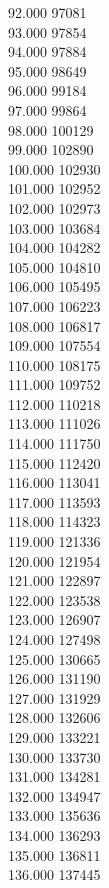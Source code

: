 { 92.000	97081 \\
 93.000	97854 \\
 94.000	97884 \\
 95.000	98649 \\
 96.000	99184 \\
 97.000	99864 \\
 98.000	100129 \\
 99.000	102890 \\
 100.000	102930 \\
 101.000	102952 \\
 102.000	102973 \\
 103.000	103684 \\
 104.000	104282 \\
 105.000	104810 \\
 106.000	105495 \\
 107.000	106223 \\
 108.000	106817 \\
 109.000	107554 \\
 110.000	108175 \\
 111.000	109752 \\
 112.000	110218 \\
 113.000	111026 \\
 114.000	111750 \\
 115.000	112420 \\
 116.000	113041 \\
 117.000	113593 \\
 118.000	114323 \\
 119.000	121336 \\
 120.000	121954 \\
 121.000	122897 \\
 122.000	123538 \\
 123.000	126907 \\
 124.000	127498 \\
 125.000	130665 \\
 126.000	131190 \\
 127.000	131929 \\
 128.000	132606 \\
 129.000	133221 \\
 130.000	133730 \\
 131.000	134281 \\
 132.000	134947 \\
 133.000	135636 \\
 134.000	136293 \\
 135.000	136811 \\
 136.000	137445 \\
}
